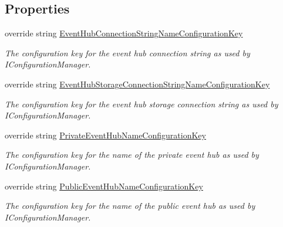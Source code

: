 \subsection*{Properties}
\begin{DoxyCompactItemize}
\item 
override string \hyperlink{classCqrs_1_1Azure_1_1ServiceBus_1_1AzureEventHubBus_a4ab2143b01ac269db357fa9dff613a4a_a4ab2143b01ac269db357fa9dff613a4a}{Event\+Hub\+Connection\+String\+Name\+Configuration\+Key}
\begin{DoxyCompactList}\small\item\em The configuration key for the event hub connection string as used by I\+Configuration\+Manager. \end{DoxyCompactList}\item 
override string \hyperlink{classCqrs_1_1Azure_1_1ServiceBus_1_1AzureEventHubBus_a56af12dd26c6a34ba444dcc8b0110337_a56af12dd26c6a34ba444dcc8b0110337}{Event\+Hub\+Storage\+Connection\+String\+Name\+Configuration\+Key}
\begin{DoxyCompactList}\small\item\em The configuration key for the event hub storage connection string as used by I\+Configuration\+Manager. \end{DoxyCompactList}\item 
override string \hyperlink{classCqrs_1_1Azure_1_1ServiceBus_1_1AzureEventHubBus_a2ad236850ff85bdb8dcc252af7b123c7_a2ad236850ff85bdb8dcc252af7b123c7}{Private\+Event\+Hub\+Name\+Configuration\+Key}
\begin{DoxyCompactList}\small\item\em The configuration key for the name of the private event hub as used by I\+Configuration\+Manager. \end{DoxyCompactList}\item 
override string \hyperlink{classCqrs_1_1Azure_1_1ServiceBus_1_1AzureEventHubBus_afd3a436ec413b208d201dab7750f8f9e_afd3a436ec413b208d201dab7750f8f9e}{Public\+Event\+Hub\+Name\+Configuration\+Key}
\begin{DoxyCompactList}\small\item\em The configuration key for the name of the public event hub as used by I\+Configuration\+Manager. \end{DoxyCompactList}\item 

\end{DoxyCompactItemize}
